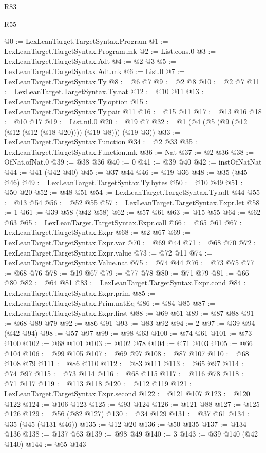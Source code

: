 \begin{lexlean}{R83}
\begin{lexlean}{R55}
\begin{coremodule}
{{{{{{{{{{{{{{{{{{{{{{{{{{{{{{{{{{{{{{{{{{{{{{{{{{{{{{{{{{{{@0 := LexLeanTarget.TargetSyntax.Program
@1 := LexLeanTarget.TargetSyntax.Program.mk
@2 := List.cons.{0}
@3 := LexLeanTarget.TargetSyntax.Adt
@4 := @2 @3
@5 := LexLeanTarget.TargetSyntax.Adt.mk
@6 := List.{0}
@7 := LexLeanTarget.TargetSyntax.Ty
@8 := @6 @7
@9 := @2 @8
@10 := @2 @7
@11 := LexLeanTarget.TargetSyntax.Ty.nat
@12 := @10 @11
@13 := LexLeanTarget.TargetSyntax.Ty.option
@15 := LexLeanTarget.TargetSyntax.Ty.pair @11
@16 := @15 @11
@17 := @13 @16
@18 := @10 @17
@19 := List.nil.{0}
@20 := @19 @7
@32 := @1 (@4 (@5 (@9 (@12 (@12 (@12 (@18 @20)))) (@19 @8))) (@19 @3))
@33 := LexLeanTarget.TargetSyntax.Function
@34 := @2 @33
@35 := LexLeanTarget.TargetSyntax.Function.mk
@36 := Nat
@37 := @2 @36
@38 := OfNat.ofNat.{0}
@39 := @38 @36
@40 := 0
@41 := @39 @40
@42 := instOfNatNat
@44 := @41 (@42 @40)
@45 := @37 @44
@46 := @19 @36
@48 := @35 (@45 @46)
@49 := LexLeanTarget.TargetSyntax.Ty.bytes
@50 := @10 @49
@51 := @50 @20
@52 := @48 @51
@54 := LexLeanTarget.TargetSyntax.Ty.adt @44
@55 := @13 @54
@56 := @52 @55
@57 := LexLeanTarget.TargetSyntax.Expr.let
@58 := 1
@61 := @39 @58 (@42 @58)
@62 := @57 @61
@63 := @15 @55
@64 := @62 @63
@65 := LexLeanTarget.TargetSyntax.Expr.call
@66 := @65 @61
@67 := LexLeanTarget.TargetSyntax.Expr
@68 := @2 @67
@69 := LexLeanTarget.TargetSyntax.Expr.var
@70 := @69 @44
@71 := @68 @70
@72 := LexLeanTarget.TargetSyntax.Expr.value
@73 := @72 @11
@74 := LexLeanTarget.TargetSyntax.Value.nat
@75 := @74 @44
@76 := @73 @75
@77 := @68 @76
@78 := @19 @67
@79 := @77 @78
@80 := @71 @79
@81 := @66 @80
@82 := @64 @81
@83 := LexLeanTarget.TargetSyntax.Expr.cond
@84 := LexLeanTarget.TargetSyntax.Expr.prim
@85 := LexLeanTarget.TargetSyntax.Prim.natEq
@86 := @84 @85
@87 := LexLeanTarget.TargetSyntax.Expr.first
@88 := @69 @61
@89 := @87 @88
@91 := @68 @89 @79
@92 := @86 @91
@93 := @83 @92
@94 := 2
@97 := @39 @94 (@42 @94)
@98 := @57 @97
@99 := @98 @63
@100 := @74 @61
@101 := @73 @100
@102 := @68 @101
@103 := @102 @78
@104 := @71 @103
@105 := @66 @104
@106 := @99 @105
@107 := @69 @97
@108 := @87 @107
@110 := @68 @108 @79
@111 := @86 @110
@112 := @83 @111
@113 := @65 @97
@114 := @74 @97
@115 := @73 @114
@116 := @68 @115
@117 := @116 @78
@118 := @71 @117
@119 := @113 @118
@120 := @112 @119
@121 := LexLeanTarget.TargetSyntax.Expr.second
@122 := @121 @107
@123 := @120 @122
@124 := @106 @123
@125 := @93 @124
@126 := @121 @88
@127 := @125 @126
@129 := @56 (@82 @127)
@130 := @34 @129
@131 := @37 @61
@134 := @35 (@45 (@131 @46))
@135 := @12 @20
@136 := @50 @135
@137 := @134 @136
@138 := @137 @63
@139 := @98 @49
@140 := 3
@143 := @39 @140 (@42 @140)
@144 := @65 @143
}}}}}}}}}}}}}}}}}}}}}}}}}}}}}}}}}}}}}}}}}}}}}}}}}}}}}}}}}}}}
\end{coremodule}
\end{lexlean}
\end{lexlean}
